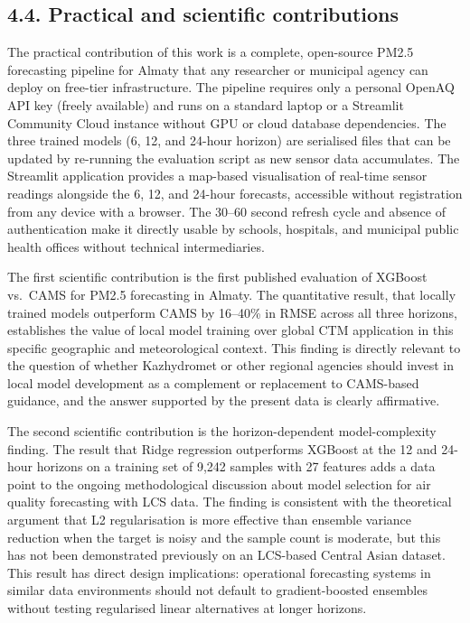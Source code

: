 \subsection{4.4. Practical and scientific contributions}\label{practical-and-scientific-contributions}

The practical contribution of this work is a complete, open-source PM2.5 forecasting pipeline for Almaty that any researcher or municipal agency can deploy on free-tier infrastructure. The pipeline requires only a personal OpenAQ API key (freely available) and runs on a standard laptop or a Streamlit Community Cloud instance without GPU or cloud database dependencies. The three trained models (6, 12, and 24-hour horizon) are serialised files that can be updated by re-running the evaluation script as new sensor data accumulates. The Streamlit application provides a map-based visualisation of real-time sensor readings alongside the 6, 12, and 24-hour forecasts, accessible without registration from any device with a browser. The 30--60 second refresh cycle and absence of authentication make it directly usable by schools, hospitals, and municipal public health offices without technical intermediaries.

The first scientific contribution is the first published evaluation of XGBoost vs.~CAMS for PM2.5 forecasting in Almaty. The quantitative result, that locally trained models outperform CAMS by 16--40\% in RMSE across all three horizons, establishes the value of local model training over global CTM application in this specific geographic and meteorological context. This finding is directly relevant to the question of whether Kazhydromet or other regional agencies should invest in local model development as a complement or replacement to CAMS-based guidance, and the answer supported by the present data is clearly affirmative.

The second scientific contribution is the horizon-dependent model-complexity finding. The result that Ridge regression outperforms XGBoost at the 12 and 24-hour horizons on a training set of 9,242 samples with 27 features adds a data point to the ongoing methodological discussion about model selection for air quality forecasting with LCS data. The finding is consistent with the theoretical argument that L2 regularisation is more effective than ensemble variance reduction when the target is noisy and the sample count is moderate, but this has not been demonstrated previously on an LCS-based Central Asian dataset. This result has direct design implications: operational forecasting systems in similar data environments should not default to gradient-boosted ensembles without testing regularised linear alternatives at longer horizons.

